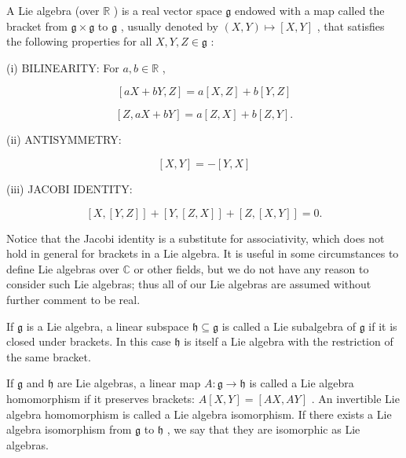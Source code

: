 \begin{definition}
\label{def:8-60-extra-2}
\mathlibok
A Lie algebra (over $\mathbb{R}$ ) is a real vector space $\mathfrak{g}$ endowed with a map called the bracket from $\mathfrak{g} \times  \mathfrak{g}$ to $\mathfrak{g}$ , usually denoted by $\left( {X, Y}\right)  \mapsto  \left\lbrack  {X, Y}\right\rbrack$ , that satisfies the following properties for all $X, Y, Z \in  \mathfrak{g}$ :

(i) BILINEARITY: For $a, b \in  \mathbb{R}$ ,

\[
\left\lbrack  {{aX} + {bY}, Z}\right\rbrack   = a\left\lbrack  {X, Z}\right\rbrack   + b\left\lbrack  {Y, Z}\right\rbrack
\]

\[
\left\lbrack  {Z,{aX} + {bY}}\right\rbrack   = a\left\lbrack  {Z, X}\right\rbrack   + b\left\lbrack  {Z, Y}\right\rbrack  .
\]

(ii) ANTISYMMETRY:

\[
\left\lbrack  {X, Y}\right\rbrack   =  - \left\lbrack  {Y, X}\right\rbrack
\]

(iii) JACOBI IDENTITY:

\[
\left\lbrack  {X,\left\lbrack  {Y, Z}\right\rbrack  }\right\rbrack   + \left\lbrack  {Y,\left\lbrack  {Z, X}\right\rbrack  }\right\rbrack   + \left\lbrack  {Z,\left\lbrack  {X, Y}\right\rbrack  }\right\rbrack   = 0.
\]

Notice that the Jacobi identity is a substitute for associativity, which does not hold in general for brackets in a Lie algebra. It is useful in some circumstances to define Lie algebras over $\mathbb{C}$ or other fields, but we do not have any reason to consider such Lie algebras; thus all of our Lie algebras are assumed without further comment to be real.
\end{definition}

\begin{definition}
\label{def:8-60-extra-3}
\mathlibok
If $\mathfrak{g}$ is a Lie algebra, a linear subspace $\mathfrak{h} \subseteq  \mathfrak{g}$ is called a Lie subalgebra of $\mathfrak{g}$ if it is closed under brackets. In this case $\mathfrak{h}$ is itself a Lie algebra with the restriction of the same bracket.
\end{definition}

\begin{definition}
\label{def:8-60-extra-4}
\mathlibok
If $\mathfrak{g}$ and $\mathfrak{h}$ are Lie algebras, a linear map $A : \mathfrak{g} \rightarrow  \mathfrak{h}$ is called a Lie algebra homomorphism if it preserves brackets: $A\left\lbrack  {X, Y}\right\rbrack   = \left\lbrack  {{AX},{AY}}\right\rbrack$ . An invertible Lie algebra homomorphism is called a Lie algebra isomorphism. If there exists a Lie algebra isomorphism from $\mathfrak{g}$ to $\mathfrak{h}$ , we say that they are isomorphic as Lie algebras.
\end{definition}

